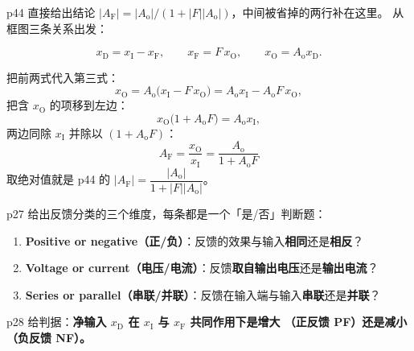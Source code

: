 \documentclass[11pt]{ctexart}
\begin{document}

p44 直接给出结论 $|A_{\mathrm{F}}|=|A_{\mathrm{o}}|/(1+|F||A_{\mathrm{o}}|)$，中间被省掉的两行补在这里。
从框图三条关系出发：

\[
x_{\mathrm{D}}=x_{\mathrm{I}}-x_{\mathrm{F}},\qquad
x_{\mathrm{F}}=F\,x_{\mathrm{O}},\qquad
x_{\mathrm{O}}=A_{\mathrm{o}}x_{\mathrm{D}} .
\]

把前两式代入第三式：
\[
x_{\mathrm{O}}=A_{\mathrm{o}}\bigl(x_{\mathrm{I}}-F\,x_{\mathrm{O}}\bigr)
=A_{\mathrm{o}}x_{\mathrm{I}}-A_{\mathrm{o}}F\,x_{\mathrm{O}},
\]
把含 $x_{\mathrm{O}}$ 的项移到左边：
\[
x_{\mathrm{O}}\bigl(1+A_{\mathrm{o}}F\bigr)=A_{\mathrm{o}}x_{\mathrm{I}},
\]
两边同除 $x_{\mathrm{I}}$ 并除以 $(1+A_{\mathrm{o}}F)$：
\[
\boxed{\;A_{\mathrm{F}}=\frac{x_{\mathrm{O}}}{x_{\mathrm{I}}}=\frac{A_{\mathrm{o}}}{1+A_{\mathrm{o}}F}\;}
\]
取绝对值就是 p44 的 $|A_{\mathrm{F}}|=\dfrac{|A_{\mathrm{o}}|}{1+|F||A_{\mathrm{o}}|}$。




p27 给出反馈分类的三个维度，每条都是一个「是/否」判断题：

\begin{enumerate}
\item \textbf{Positive or negative（正/负）}：反馈的效果与输入\textbf{相同}还是\textbf{相反}？
\item \textbf{Voltage or current（电压/电流）}：反馈\textbf{取自输出电压}还是\textbf{输出电流}？
\item \textbf{Series or parallel（串联/并联）}：反馈在输入端与输入\textbf{串联}还是\textbf{并联}？
\end{enumerate}


p28 给判据：\textbf{净输入 $x_{\mathrm{D}}$ 在 $x_{\mathrm{I}}$ 与 $x_{\mathrm{F}}$ 共同作用下是增大
（正反馈 PF）还是减小（负反馈 NF）。}
\end{document}
